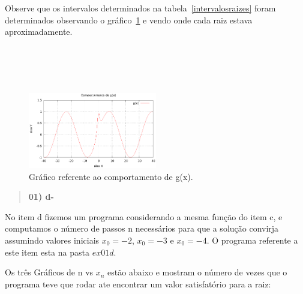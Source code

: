 \documentclass[a4wide]{report}
\begin{document}
Observe que os intervalos determinados na tabela~\ref{intervalosraizes} foram determinados observando 
o gráfico~\ref{ex01a1.3}  e vendo onde cada raiz estava aproximadamente.
\\
\\
\\
\\
\\

\begin{figure}[h]
\centering
\includegraphics[width=0.5\textwidth]{teste}
\caption{Gráfico referente ao comportamento de g(x).}
\label{ex01a1.3}
\end{figure}
\begin{quote}

\bf 01) d-

\end{quote}

No item d fizemos um programa considerando a mesma função do item c, e computamos o número de passos n
necessários para que a solução convirja assumindo valores iniciais $x_0 = -2$, $x_0 = -3$ e $x_0 = -4$.
O programa referente a este item esta na pasta $ex01d$.

Os três Gráficos de n vs $x_n$ estão abaixo e mostram o número de vezes que o programa teve que rodar ate 
encontrar um valor satisfatório para a raiz:
\end{document}
